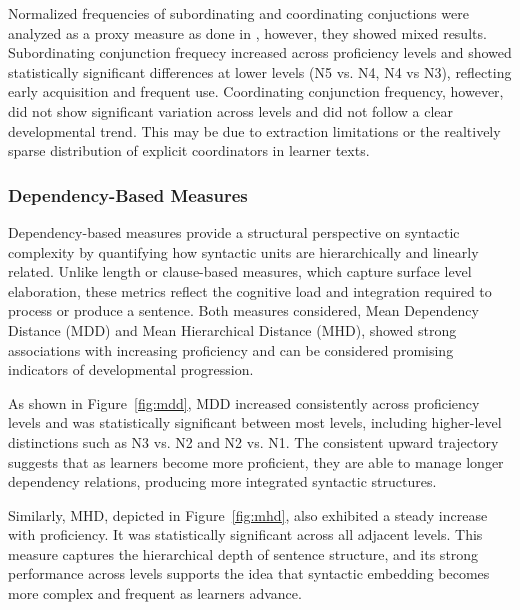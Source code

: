 Normalized frequencies of subordinating and coordinating conjuctions were analyzed as a proxy measure as done in \citet{Vyatkina2012}, however, they showed mixed results. Subordinating conjunction frequecy increased across proficiency levels and showed statistically significant differences at lower levels (N5 vs. N4, N4 vs N3), reflecting early acquisition and frequent use. Coordinating conjunction frequency, however, did not show significant variation across levels and did not follow a clear developmental trend. This may be due to extraction limitations or the realtively sparse distribution of explicit coordinators in learner texts.

\subsubsection{Dependency-Based Measures}

Dependency-based measures provide a structural perspective on syntactic complexity by quantifying how syntactic
units are hierarchically and linearly related. Unlike length or clause-based measures, which capture surface level
elaboration, these metrics reflect the cognitive load and integration required to process or produce a sentence.
Both measures considered, Mean Dependency Distance (MDD) and Mean Hierarchical Distance (MHD), showed strong
associations with increasing proficiency and can be considered promising indicators of developmental progression.

As shown in Figure~\ref{fig:mdd}, MDD increased consistently across proficiency levels and was statistically
significant between most levels, including higher-level distinctions such as N3 vs. N2 and N2 vs. N1. The consistent
upward trajectory suggests that as learners become more proficient, they are able to manage longer dependency
relations, producing more integrated syntactic structures.


Similarly, MHD, depicted in Figure~\ref{fig:mhd}, also exhibited a steady increase with proficiency. It was
statistically significant across all adjacent levels. This measure captures the hierarchical depth of sentence
structure, and its strong performance across levels supports the idea that syntactic embedding becomes more complex
and frequent as learners advance.

